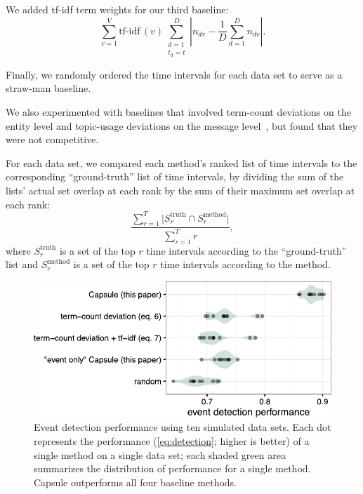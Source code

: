 We added tf-idf term weights for our third baseline:
\begin{equation}
  \sum_{v=1}^V \textrm{tf-idf}\,(v)
  \sum_{\substack{d=1\\t_d\!=\!t}}^D \left\lvert n_{dv} - \frac{1}{D}\sum_{d=1}^D
  n_{dv} \right\rvert.
\label{eq:tfidfwordev}
\end{equation}

Finally, we randomly ordered the time intervals for each data set to
serve as a straw-man baseline.

We also experimented with baselines that involved term-count
deviations on the entity level and topic-usage deviations on the
message level~\cite{dou2012leadline}, but found that they were not
competitive.

For each data set, we compared each method's ranked list of time
intervals to the corresponding ``ground-truth'' list of time
intervals, by dividing the sum of the lists' actual set overlap at
each rank by the sum of their maximum set overlap at each rank:
\begin{equation}
\frac{\sum_{r=1}^T \vert S^{\textrm{truth}}_r \cap
  S^{\textrm{method}}_r \vert}{\sum_{r=1}^T r},
\label{eq:detection}
\end{equation}
where $S^{\textrm{truth}}_r$ is a set of the top $r$ time intervals
according to the ``ground-truth'' list and $S^{\textrm{method}}_r$ is
a set of the top $r$ time intervals according to the method.

\begin{figure}[t]
\centering
\includegraphics[width=\linewidth]{fig/sim_eventdetect.pdf}
\caption{Event detection performance using ten simulated data
  sets. Each dot represents the performance (\cref{eq:detection};
  higher is better) of a single method on a single data set; each
  shaded green area summarizes the distribution of performance for a
  single method.  Capsule outperforms all four baseline methods.}
\label{fig:sim_eventdetect}
\end{figure}


